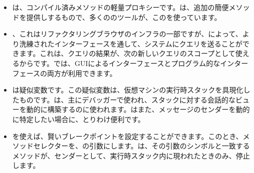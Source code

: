 \documentclass[a4paper,10pt,twoside]{book}
\begin{document}
\begin{itemize}
\item {}は、コンパイル済みメソッドの軽量プロキシーです。は、追加の簡便メソッドを提供しするもので、多くの\st{}のツールが、このを使っています。
\item {}、これはリファクタリングブラウザのインフラの一部ですが、によって、より洗練されたインターフェースを通して、システムにクエリを送ることができます。これは、クエリの結果が、次の新しいクエリのスコープとして使えるからです。では、GUIによるインターフェースとプログラム的なインターフェースの両方が利用できます。%
\item {}は疑似変数です。この疑似変数は、仮想マシンの実行時スタックを具現化したものです。は、主にデバッガーで使われ、スタックに対する会話的なビューを動的に構築するのに使われます。はまた、メッセージのセンダーを動的に特定したい場合に、とりわけ便利です。%
\item {}を使えば、賢いブレークポイントを設定することができます。このとき、メソッドセレクターを、の引数にします。は、その引数のシンボルと一致するメソッドが、センダーとして、実行時スタック内に現われたときのみ、停止します。

\end{itemize}
\end{document}
